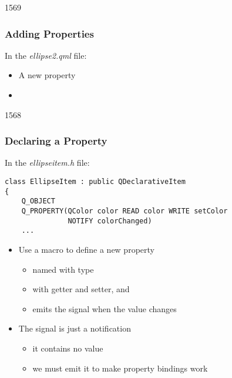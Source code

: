 \begin{slide}[fragile]{1569}\frametitle{Adding Properties}

In the \textit{ellipse2.qml} file:

\medskip

\medskip
\begin{itemize}
\item A new  property
\item[] 
\end{itemize}

\end{slide}

\begin{slide}[fragile]{1568}\frametitle{Declaring a Property}

In the \textit{ellipseitem.h} file:

\vspace*{0.5em}
\begin{lstlisting}
class EllipseItem : public QDeclarativeItem
{
    Q_OBJECT
    Q_PROPERTY(QColor color READ color WRITE setColor
               NOTIFY colorChanged)
    ...
\end{lstlisting}

\begin{itemize}
\item Use a  macro to define a new property
  \begin{itemize}
  \item named  with  type
  \item with getter and setter,  and 
  \item emits the  signal when the value changes
  \end{itemize}
  \vspace*{0.5em}
\item The signal is just a notification
  \begin{itemize}
  \item it contains no value
  \item we must emit it to make property bindings work
  \end{itemize}
\end{itemize}

\end{slide}

